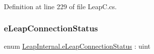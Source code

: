 Definition at line 229 of file Leap\+C.\+cs.

\mbox{\label{namespace_leap_internal_a98a6a4220fcab393d11bf4ec2eecdea6}} 
\subsubsection{\texorpdfstring{eLeapConnectionStatus}{eLeapConnectionStatus}}
{\footnotesize\ttfamily enum \mbox{\hyperlink{namespace_leap_internal_a98a6a4220fcab393d11bf4ec2eecdea6}{Leap\+Internal.\+e\+Leap\+Connection\+Status}} \+: uint\hspace{0.3cm}{\ttfamily [strong]}}

